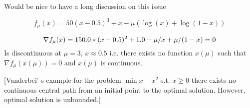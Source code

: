 \documentclass{article}
\begin{document}
Would be nice to have a long discussion on this issue

$$
f_{\mu}(x) = 50 (x - 0.5)^3 + x - \mu (\log(x) + \log(1 - x))
$$

$$
\nabla f_{\mu}(x) = 150.0 * (x - 0.5)^2 + 1.0  - \mu / x + \mu / (1 - x) = 0 \\
$$
Is discontinuous at $\mu = 3$, $x \approx 0.5$ i.e. there exists no function $x(\mu)$ such that $\nabla f_{\mu}(x(\mu)) = 0$ and $x(\mu)$ is continuous. 

[Vanderbei' s example for the problem $\min{ x -x^2}$ s.t. $x \ge 0$ there exists no continuous central path from an initial point to the optimal solution. However, optimal solution is unbounded.]
\end{document}
